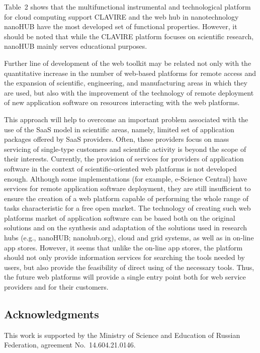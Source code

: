 \documentclass[procedia]{easychair}
\begin{document}
Table~2 shows that the multifunctional instrumental and technological platform for cloud computing support CLAVIRE and the web hub in nanotechnology nanoHUB have the most developed set of functional properties. However, it should be noted that while the CLAVIRE platform  focuses on scientific research, nanoHUB mainly serves educational purposes.

Further line of development of the web toolkit may be related not only with the quantitative increase in the number of web-based platforms for remote access and the expansion of scientific, engineering, and manufacturing areas in which they are used, but also with the improvement of the technology of remote deployment of new application software on resources interacting with the web platforms.

This approach will help to overcome an important problem associated with the use of the SaaS model in scientific areas, namely, limited set of application packages offered by SaaS providers. Often, these providers focus on mass servicing of single-type customers and scientific activity is beyond the scope of their interests. Currently, the provision of services for providers of application software in the context of scientific-oriented web platforms is not developed enough. Although some implementations (for example, e-Science Central) have services for remote application software deployment, they are still insufficient to ensure the creation of a web platform capable of performing the whole range of tasks characteristic for a free open market. The technology of creating such web platforms market of application software can be based both on the original solutions and on the synthesis and adaptation of the solutions used in research hubs (e.g., nanoHUB; nanohub.org), cloud and grid systems, as well as in on-line app stores. However, it seems that unlike the on-line app stores, the platform should not only provide information services for searching the tools needed by users, but also provide the feasibility of direct using of the necessary tools. Thus, the future web platforms will provide a single entry point both for web service providers and for their customers.

\subsection*{Acknowledgments}
\label{sect:acks}

This work is supported by the Ministry of Science and Education of Russian Federation, agreement No. 14.604.21.0146.

\label{sect:bib}


\end{document}
